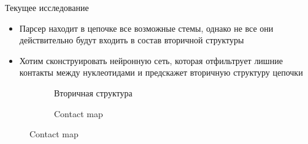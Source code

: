 \documentclass{beamer}
\begin{document}
\begin{frame}{Текущее исследование} 
\begin{itemize}
    \item Парсер находит в цепочке все возможные стемы, однако не все они действительно будут входить в состав вторичной структуры
    \item Хотим сконструировать нейронную сеть, которая отфильтрует лишние контакты между нуклеотидами и предскажет вторичную структуру цепочки
\end{itemize}
\vspace{0.5cm}
\begin{figure}
\centering
\begin{subfigure}{.3\textwidth}
  \centering
  \caption{Вторичная структура}
\end{subfigure}%
\begin{subfigure}{.3\textwidth}
  \centering
  \caption{Contact map}

\end{subfigure}
\end{figure}
\end{frame}
\end{document}
